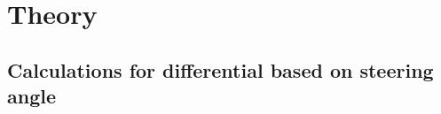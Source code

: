 




\chapter{Theory}

\section{Calculations for differential based on steering angle} \label{diff_calc}

